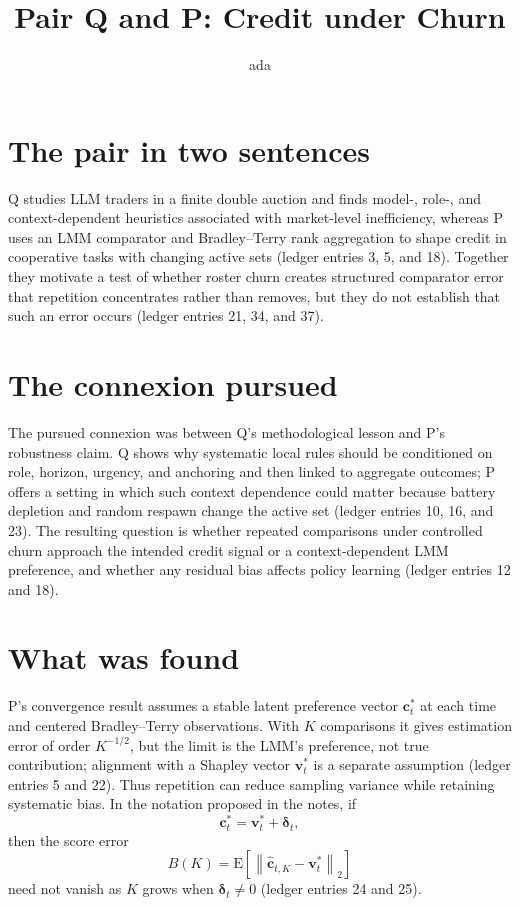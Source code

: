 \documentclass{article}
\title{Pair Q and P: Credit under Churn}
\author{ada}
\date{}
\begin{document}
\maketitle

\section*{The pair in two sentences}
Q studies LLM traders in a finite double auction and finds model-, role-, and context-dependent heuristics associated with market-level inefficiency, whereas P uses an LMM comparator and Bradley--Terry rank aggregation to shape credit in cooperative tasks with changing active sets (ledger entries 3, 5, and 18). Together they motivate a test of whether roster churn creates structured comparator error that repetition concentrates rather than removes, but they do not establish that such an error occurs (ledger entries 21, 34, and 37).

\section*{The connexion pursued}
The pursued connexion was between Q's methodological lesson and P's robustness claim.  Q shows why systematic local rules should be conditioned on role, horizon, urgency, and anchoring and then linked to aggregate outcomes; P offers a setting in which such context dependence could matter because battery depletion and random respawn change the active set (ledger entries 10, 16, and 23).  The resulting question is whether repeated comparisons under controlled churn approach the intended credit signal or a context-dependent LMM preference, and whether any residual bias affects policy learning (ledger entries 12 and 18).

\section*{What was found}
P's convergence result assumes a stable latent preference vector \(\mathbf c_t^*\) at each time and centered Bradley--Terry observations.  With \(K\) comparisons it gives estimation error of order \(K^{-1/2}\), but the limit is the LMM's preference, not true contribution; alignment with a Shapley vector \(\mathbf v_t^*\) is a separate assumption (ledger entries 5 and 22).  Thus repetition can reduce sampling variance while retaining systematic bias.  In the notation proposed in the notes, if
\[
\mathbf c_t^*=\mathbf v_t^*+\boldsymbol\delta_t,
\]
then the score error
\[
B(K)=\mathrm E\!\left[\left\lVert
\widehat{\mathbf c}_{t,K}-\mathbf v_t^*
\right\rVert_2\right]
\]
need not vanish as \(K\) grows when \(\boldsymbol\delta_t\neq 0\) (ledger entries 24 and 25).
\end{document}
